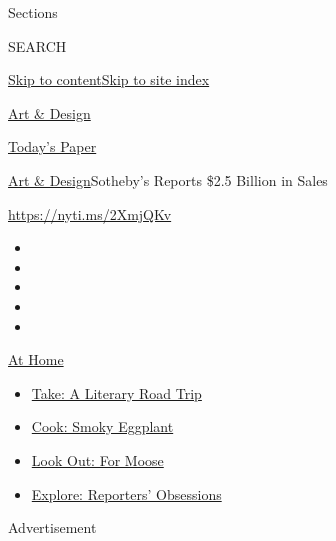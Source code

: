 Sections

SEARCH

\protect\hyperlink{site-content}{Skip to
content}\protect\hyperlink{site-index}{Skip to site index}

\href{https://www.nytimes.com/section/arts/design}{Art \& Design}

\href{https://myaccount.nytimes.com/auth/login?response_type=cookie\&client_id=vi}{}

\href{https://www.nytimes.com/section/todayspaper}{Today's Paper}

\href{/section/arts/design}{Art \& Design}\textbar{}Sotheby's Reports
\$2.5 Billion in Sales

\url{https://nyti.ms/2XmjQKv}

\begin{itemize}
\item
\item
\item
\item
\item
\end{itemize}

\href{https://www.nytimes.com/spotlight/at-home?action=click\&pgtype=Article\&state=default\&region=TOP_BANNER\&context=at_home_menu}{At
Home}

\begin{itemize}
\tightlist
\item
  \href{https://www.nytimes.com/2020/07/28/books/time-for-a-literary-road-trip.html?action=click\&pgtype=Article\&state=default\&region=TOP_BANNER\&context=at_home_menu}{Take:
  A Literary Road Trip}
\item
  \href{https://www.nytimes.com/2020/07/29/magazine/bored-with-your-home-cooking-some-smoky-eggplant-will-fix-that.html?action=click\&pgtype=Article\&state=default\&region=TOP_BANNER\&context=at_home_menu}{Cook:
  Smoky Eggplant}
\item
  \href{https://www.nytimes.com/2020/07/27/travel/moose-michigan-isle-royale.html?action=click\&pgtype=Article\&state=default\&region=TOP_BANNER\&context=at_home_menu}{Look
  Out: For Moose}
\item
  \href{https://www.nytimes.com/interactive/2020/at-home/even-more-reporters-editors-diaries-lists-recommendations.html?action=click\&pgtype=Article\&state=default\&region=TOP_BANNER\&context=at_home_menu}{Explore:
  Reporters' Obsessions}
\end{itemize}

Advertisement

